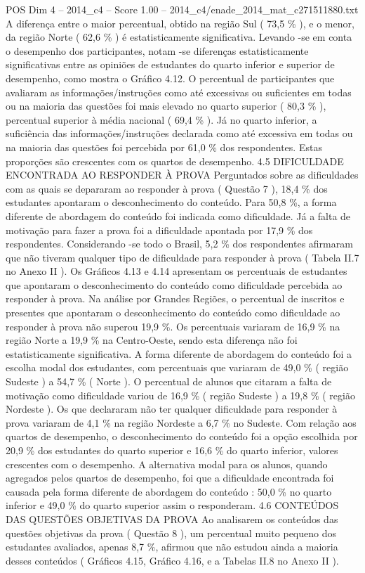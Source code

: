 \begin{textsample}{POS Dim 4 – 2014\_c4 – Score 1.00 – 2014\_c4/enade\_2014\_mat\_c271511880.txt}
A diferença entre o maior percentual, obtido na região Sul ( 73,5 \% ), e o menor, da região Norte ( 62,6 \% ) é estatisticamente significativa.
Levando -se em conta o desempenho dos participantes, notam -se diferenças estatisticamente significativas entre as opiniões de estudantes do quarto inferior e superior de desempenho, como mostra o Gráfico 4.12.
O percentual de participantes que avaliaram as informações/instruções como até excessivas ou suficientes em todas ou na maioria das questões foi mais elevado no quarto superior ( 80,3 \% ), percentual superior à média nacional ( 69,4 \% ).
Já no quarto inferior, a suficiência das informações/instruções declarada como até excessiva em todas ou na maioria das questões foi percebida por 61,0 \% dos respondentes.
Estas proporções são crescentes com os quartos de desempenho. 4.5 DIFICULDADE ENCONTRADA AO RESPONDER À PROVA Perguntados sobre as dificuldades com as quais se depararam ao responder à prova ( Questão 7 ), 18,4 \% dos estudantes apontaram o desconhecimento do conteúdo.
Para 50,8 \%, a forma diferente de abordagem do conteúdo foi indicada como dificuldade.
Já a falta de motivação para fazer a prova foi a dificuldade apontada por 17,9 \% dos respondentes.
Considerando -se todo o Brasil, 5,2 \% dos respondentes afirmaram que não tiveram qualquer tipo de dificuldade para responder à prova ( Tabela II.7 no Anexo II ).
Os Gráficos 4.13 e 4.14 apresentam os percentuais de estudantes que apontaram o desconhecimento do conteúdo como dificuldade percebida ao responder à prova.
Na análise por Grandes Regiões, o percentual de inscritos e presentes que apontaram o desconhecimento do conteúdo como dificuldade ao responder à prova não superou 19,9 \%.
Os percentuais variaram de 16,9 \% na região Norte a 19,9 \% na Centro-Oeste, sendo esta diferença não foi estatisticamente significativa.
A forma diferente de abordagem do conteúdo foi a escolha modal dos estudantes, com percentuais que variaram de 49,0 \% ( região Sudeste ) a 54,7 \% ( Norte ).
O percentual de alunos que citaram a falta de motivação como dificuldade variou de 16,9 \% ( região Sudeste ) a 19,8 \% ( região Nordeste ).
Os que declararam não ter qualquer dificuldade para responder à prova variaram de 4,1 \% na região Nordeste a 6,7 \% no Sudeste.
Com relação aos quartos de desempenho, o desconhecimento do conteúdo foi a opção escolhida por 20,9 \% dos estudantes do quarto superior e 16,6 \% do quarto inferior, valores crescentes com o desempenho.
A alternativa modal para os alunos, quando agregados pelos quartos de desempenho, foi que a dificuldade encontrada foi causada pela forma diferente de abordagem do conteúdo : 50,0 \% no quarto inferior e 49,0 \% do quarto superior assim o responderam. 4.6 CONTEÚDOS DAS QUESTÕES OBJETIVAS DA PROVA Ao analisarem os conteúdos das questões objetivas da prova ( Questão 8 ), um percentual muito pequeno dos estudantes avaliados, apenas 8,7 \%, afirmou que não estudou ainda a maioria desses conteúdos ( Gráficos 4.15, Gráfico 4.16, e a Tabelas II.8 no Anexo II ).

\end{textsample}
